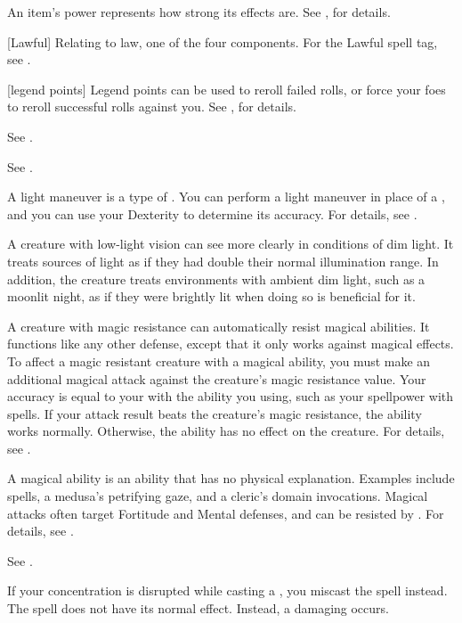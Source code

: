  An item's power represents how strong its effects are.
See , for details.

[Lawful] Relating to law, one of the four  components. For the Lawful spell tag, see .

[legend points] Legend points can be used to reroll failed rolls, or force your foes to reroll successful rolls against you. See , for details.

 See .

 See .

 A light maneuver is a type of .
You can perform a light maneuver in place of a , and you can use your Dexterity to determine its accuracy.
For details, see .

 A creature with low-light vision can see more clearly in conditions of dim light.
It treats sources of light as if they had double their normal illumination range.
In addition, the creature treats environments with ambient dim light, such as a moonlit night, as if they were brightly lit when doing so is beneficial for it.

 A creature with magic resistance can automatically resist magical abilities.
It functions like any other defense, except that it only works against magical effects.
To affect a magic resistant creature with a magical ability, you must make an additional magical attack against the creature's magic resistance value.
Your accuracy is equal to your  with the ability you using, such as your spellpower with spells.
If your attack result beats the creature's magic resistance, the ability works normally.
Otherwise, the ability has no effect on the creature.
For details, see .

 A magical ability is an ability that has no physical explanation.
Examples include spells, a medusa's petrifying gaze, and a cleric's domain invocations.
Magical attacks often target Fortitude and Mental defenses, and can be resisted by .
For details, see .

 See .

 If your concentration is disrupted while casting a , you miscast the spell instead.
The spell does not have its normal effect.
Instead, a damaging  occurs.

